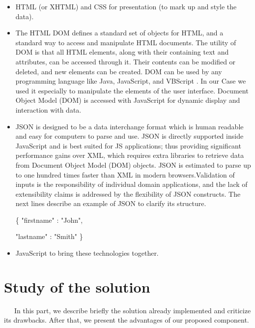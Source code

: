\begin{itemize}
    
    \item HTML (or XHTML) and CSS for presentation (to mark up and style the data).
    
    \item The HTML DOM defines a standard set of objects for HTML, and a standard way to access
and manipulate HTML documents. The utility of DOM is that all HTML elements, along with
their containing text and attributes, can be accessed through it. Their contents can be modified or deleted, and new elements can be created. DOM can be used by any programming language like
Java, JavaScript, and VBScript \cite{w3school}. In our Case we used it especially to manipulate the elements of the user interface.
Document Object Model (DOM) is accessed with JavaScript for dynamic display and
interaction with data. 


\item JSON is designed to be a data interchange format which is human readable and easy for computers to parse and use. JSON is directly supported inside JavaScript and is best suited for JS applications; thus providing significant performance gains over XML, which requires extra libraries to retrieve data from Document Object Model (DOM) objects. JSON is estimated to parse up to one hundred times faster than XML in modern browsers.Validation of inputs is the responsibility of individual domain applications, and the lack of extensibility claims is addressed by the flexibility of JSON constructs. \cite{json} The next lines describe an example of JSON to clarify its structure.

\{ "firstname" : "John",

"lastname" : "Smith" \}

\item JavaScript to bring these technologies together.

\end{itemize}
\fi %



\section{Study of the solution}
~~~In this part, we describe briefly the solution already implemented and criticize its drawbacks. After that, we present the advantages of our proposed component.

